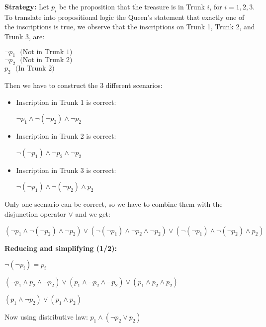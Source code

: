 \begin{tcolorbox}[title=Example 1: King's Daughter Treasure Logic Puzzle (1/2)]
\textbf{Strategy:}  
Let $p_i$ be the proposition that the treasure is in Trunk $i$, for $i = 1, 2, 3$. To translate into
propositional logic the Queen’s statement that exactly one of the inscriptions is true, we observe
that the inscriptions on Trunk 1, Trunk 2, and Trunk 3, are:
\begin{center}
$\neg p_1 \ \ \  \text{(Not in Trunk 1)} $ \\
$\neg p_2 \ \ \  \text{(Not in Trunk 2)} $ \\
$p_2 \ \ \  \text{(In Trunk 2)} $ \\
\end{center}
Then we have to construct the 3 different scenarios:
\begin{itemize}
    \item Inscription in Trunk 1 is correct:
    \begin{center}
$\neg p_1 \land \neg(\neg p_2) \land \neg p_2$    
\end{center}
   \item Inscription in Trunk 2 is correct:
    \begin{center}
$\neg (\neg p_1) \land \neg p_2 \land \neg p_2$    
\end{center}
    \item Inscription in Trunk 3 is correct:
    \begin{center}
$\neg (\neg p_1) \land \neg (\neg p_2) \land p_2$    
\end{center}
\end{itemize}
Only one scenario can be correct, so we have to combine them with the disjunction operator $\lor$ and we get:
\begin{center}
$\left( \neg p_1 \land \neg(\neg p_2) \land \neg p_2 \right) \lor \left(\neg (\neg p_1) \land \neg p_2 \land \neg p_2 \right) \lor \left(\neg (\neg p_1) \land \neg (\neg p_2) \land p_2 \right) $    
\end{center}
\textbf{Reducing and simplifying (1/2):}
\begin{center}
$\neg (\neg p_i) = p_i $    
\end{center}
\begin{center}
$\left( \neg p_1 \land p_2 \land \neg p_2 \right) \lor \left(p_1 \land \neg p_2 \land \neg p_2 \right) \lor \left(p_1 \land  p_2 \land p_2 \right) $    
\end{center}
\begin{center}
$\left(p_1 \land \neg p_2  \right) \lor \left(p_1 \land  p_2\right) $    
\end{center}
Now using distributive law: $p_1 \land (\neg p_2 \lor p_2) $ 
\end{tcolorbox}
